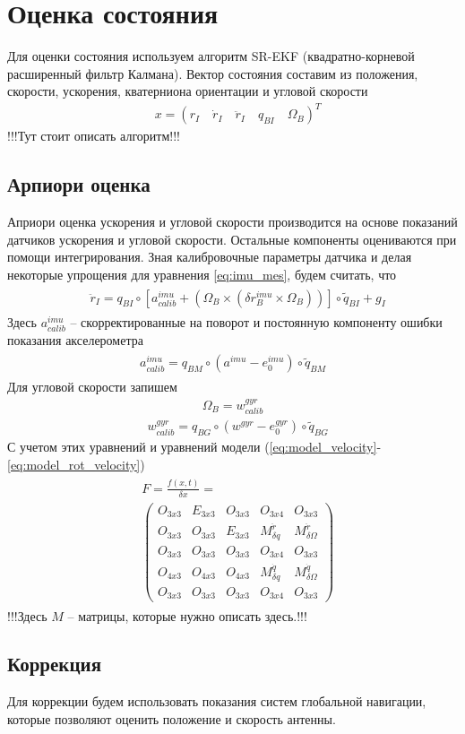 \documentclass[a4paper,12pt]{article}
\begin{document}
\section{Оценка состояния}
Для оценки состояния используем алгоритм SR-EKF (квадратно-корневой расширенный фильтр Калмана). Вектор состояния составим из положения, скорости, ускорения, кватерниона ориентации и угловой скорости
\begin{align} 
&x = (r_I \quad \dot{r}_I \quad \ddot{r}_I \quad q_{BI} \quad \Omega_B)^T
\end{align}
!!!Тут стоит описать алгоритм!!!

\subsection{Арпиори оценка}
Априори оценка ускорения и угловой скорости производится на основе показаний датчиков ускорения и угловой скорости. Остальные компоненты оцениваются при помощи интегрирования.
Зная калибровочные параметры датчика и делая некоторые упрощения для уравнения \eqref{eq:imu_mes}, будем считать, что
\begin{align} 
\begin{split}
&\ddot{r}_{I} = {q}_{BI} \circ  [a^{imu}_{calib} + (\Omega_B \times (\delta r^{imu}_B \times \Omega_B))] \circ \tilde{q}_{BI} + g_I
\end{split}
\end{align}
Здесь $a^{imu}_{calib}$ -- скорректированные на поворот и постоянную компоненту ошибки показания акселерометра
\begin{align} 
\begin{split}
a^{imu}_{calib} = q_{BM} \circ (a^{imu} - e^{imu}_0) \circ \tilde{q}_{BM}
\end{split}
\end{align}
Для угловой скорости запишем
\begin{align} 
\Omega_B = w^{\textit{gyr}}_{calib}
\end{align}
\begin{align} 
&w^{\textit{gyr}}_{calib} = q_{BG} \circ (w^{\textit{gyr}} - e_0^{\textit{gyr}}) \circ \tilde{q}_{BG}
\end{align}
С учетом этих уравнений и уравнений модели  (\ref{eq:model_velocity}-\ref{eq:model_rot_velocity})
\begin{align}
\begin{split}
&F = \frac{f(x,t)}{\delta x} = \\
&\begin{pmatrix}
O_{3x3} & E_{3x3} & O_{3x3} & O_{3x4} & O_{3x3}\\
O_{3x3} & O_{3x3} & E_{3x3} & M^{\ddot{r}}_{\delta q} &M^{\ddot{r}}_{\delta \Omega}\\
O_{3x3} & O_{3x3} & O_{3x3} & O_{3x4} & O_{3x3}\\
O_{4x3} & O_{4x3} & O_{4x3} & M^{\dot{q}}_{\delta q} & M^{\dot{q}}_{\delta \Omega}\\
O_{3x3} & O_{3x3} & O_{3x3} & O_{3x4} & O_{3x3}
\end{pmatrix}
\end{split}
\end{align}
!!!Здесь $M$ -- матрицы, которые нужно описать здесь.!!!
\subsection{Коррекция}
Для коррекции будем использовать показания систем глобальной навигации, которые позволяют оценить положение и скорость антенны.
\end{document}
